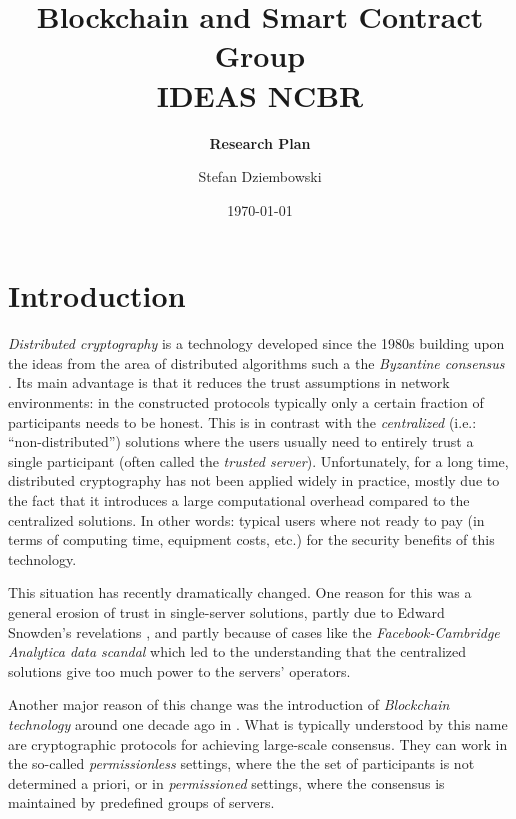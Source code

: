 \documentclass{article}
\title{\textbf{Blockchain and Smart Contract Group\\ IDEAS NCBR}}
\subtitle{\textbf{Research Plan}}
\date{\today}
\author{Stefan Dziembowski}
\begin{document}
	
\maketitle

\section{Introduction}


\emph{Distributed cryptography} is a technology developed since the 1980s \cite{DBLP:conf/focs/Yao86,DBLP:conf/stoc/GoldreichMW87,DBLP:conf/crypto/ChaumCD87,DBLP:conf/stoc/Ben-OrGW88} building upon the ideas from the area of distributed algorithms such a the \emph{Byzantine consensus} \cite{DBLP:journals/toplas/LamportSP82}.  Its main advantage is that it reduces the trust assumptions in network environments: in the constructed protocols typically only a certain fraction of participants needs to be honest. This is in contrast with the \emph{centralized} (i.e.: ``non-distributed'') solutions where the users usually need to entirely trust a single participant (often called the \emph{trusted server}). Unfortunately, for a long time, distributed cryptography has not been applied  widely in practice, mostly due to the fact that it introduces a large computational overhead compared to the centralized solutions. In other words: typical users where not ready to pay (in terms of computing time, equipment costs, etc.) for the security benefits of this technology.

This situation has  recently dramatically changed. One reason for this was a general erosion of trust in single-server solutions, partly due to Edward Snowden's revelations \cite{enwiki:1029775076}, and partly because of cases like the \emph{Facebook-Cambridge Analytica data scandal} \cite{enwiki:1029165846} which led to the understanding that the centralized solutions give too much power to the servers' operators. 

Another major reason of this change was the introduction of \emph{Blockchain technology} around one decade ago in \cite{nakamoto2008bitcoin}. 
What is typically understood by this name are cryptographic protocols for achieving large-scale consensus. They can work in the so-called \emph{permissionless} settings, where the the set of participants is not determined a priori, or in \emph{permissioned} settings, where the consensus is maintained by predefined groups of servers. 
\end{document}
